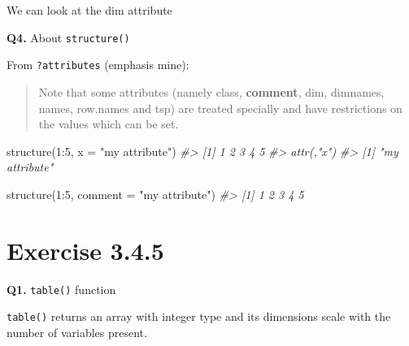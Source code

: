 \documentclass[
]{book}
\newenvironment{Shaded}{\begin{snugshade}}{\end{snugshade}}
\newcommand{\AttributeTok}[1]{\textcolor[rgb]{0.77,0.63,0.00}{#1}}
\newcommand{\CommentTok}[1]{\textcolor[rgb]{0.56,0.35,0.01}{\textit{#1}}}
\newcommand{\DecValTok}[1]{\textcolor[rgb]{0.00,0.00,0.81}{#1}}
\newcommand{\FunctionTok}[1]{\textcolor[rgb]{0.00,0.00,0.00}{#1}}
\newcommand{\NormalTok}[1]{#1}
\newcommand{\SpecialCharTok}[1]{\textcolor[rgb]{0.00,0.00,0.00}{#1}}
\newcommand{\StringTok}[1]{\textcolor[rgb]{0.31,0.60,0.02}{#1}}
\begin{document}
We can look at the dim attribute

\textbf{Q4.} About \texttt{structure()}

From \texttt{?attributes} (emphasis mine):

\begin{quote}
Note that some attributes (namely class, \textbf{comment}, dim, dimnames, names, row.names and tsp) are treated specially and have restrictions on the values which can be set.
\end{quote}

\begin{Shaded}
\begin{Highlighting}[]
\FunctionTok{structure}\NormalTok{(}\DecValTok{1}\SpecialCharTok{:}\DecValTok{5}\NormalTok{, }\AttributeTok{x =} \StringTok{"my attribute"}\NormalTok{)}
\CommentTok{\#\textgreater{} [1] 1 2 3 4 5}
\CommentTok{\#\textgreater{} attr(,"x")}
\CommentTok{\#\textgreater{} [1] "my attribute"}

\FunctionTok{structure}\NormalTok{(}\DecValTok{1}\SpecialCharTok{:}\DecValTok{5}\NormalTok{, }\AttributeTok{comment =} \StringTok{"my attribute"}\NormalTok{)}
\CommentTok{\#\textgreater{} [1] 1 2 3 4 5}
\end{Highlighting}
\end{Shaded}

\hypertarget{exercise-3.4.5}{%
\section{Exercise 3.4.5}\label{exercise-3.4.5}}

\textbf{Q1.} \texttt{table()} function

\texttt{table()} returns an array with integer type and its dimensions scale with the number of variables present.
\end{document}
